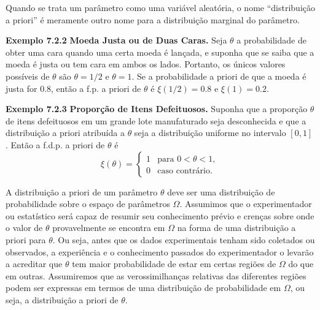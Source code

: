 \vspace{1cm}
Quando se trata um parâmetro como uma variável aleatória, o nome ``distribuição a priori'' é meramente outro nome para a distribuição marginal do parâmetro.

\vspace{1cm}
\noindent\textbf{Exemplo 7.2.2} \quad \textbf{Moeda Justa ou de Duas Caras.} Seja $\theta$ a probabilidade de obter uma cara quando uma certa moeda é lançada, e suponha que se saiba que a moeda é justa ou tem cara em ambos os lados. Portanto, os únicos valores possíveis de $\theta$ são $\theta=1/2$ e $\theta=1$. Se a probabilidade a priori de que a moeda é justa for 0.8, então a f.p. a priori de $\theta$ é $\xi(1/2)=0.8$ e $\xi(1)=0.2$.

\vspace{1cm}
\noindent\textbf{Exemplo 7.2.3} \quad \textbf{Proporção de Itens Defeituosos.} Suponha que a proporção $\theta$ de itens defeituosos em um grande lote manufaturado seja desconhecida e que a distribuição a priori atribuída a $\theta$ seja a distribuição uniforme no intervalo $[0, 1]$. Então a f.d.p. a priori de $\theta$ é
\begin{equation}
\xi(\theta) = 
\begin{cases}
1 & \text{para } 0 < \theta < 1, \\
0 & \text{caso contrário.}
\end{cases}
\tag{7.2.1}
\end{equation}

A distribuição a priori de um parâmetro $\theta$ deve ser uma distribuição de probabilidade sobre o espaço de parâmetros $\Omega$. Assumimos que o experimentador ou estatístico será capaz de resumir seu conhecimento prévio e crenças sobre onde o valor de $\theta$ provavelmente se encontra em $\Omega$ na forma de uma distribuição a priori para $\theta$. Ou seja, antes que os dados experimentais tenham sido coletados ou observados, a experiência e o conhecimento passados do experimentador o levarão a acreditar que $\theta$ tem maior probabilidade de estar em certas regiões de $\Omega$ do que em outras. Assumiremos que as verossimilhanças relativas das diferentes regiões podem ser expressas em termos de uma distribuição de probabilidade em $\Omega$, ou seja, a distribuição a priori de $\theta$.

